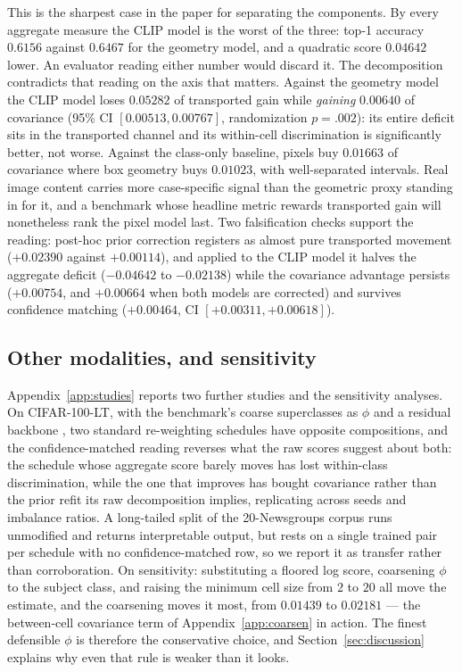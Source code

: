 This is the sharpest case in the paper for separating the components. By every aggregate
measure the CLIP model is the worst of the three: top-1 accuracy $0.6156$ against $0.6467$
for the geometry model, and a quadratic score $0.04642$ lower. An evaluator reading either
number would discard it. The decomposition contradicts that reading on the axis that
matters. Against the geometry model the CLIP model loses $0.05282$ of transported gain while
\emph{gaining} $0.00640$ of covariance (95\% CI $[0.00513,0.00767]$, randomization
$p=.002$): its entire deficit sits in the transported channel and its within-cell
discrimination is significantly better, not worse. Against the class-only baseline, pixels
buy $0.01663$ of covariance where box geometry buys $0.01023$, with well-separated intervals.
Real image content carries more case-specific signal than the geometric proxy standing in for
it, and a benchmark whose headline metric rewards transported gain will nonetheless rank the
pixel model last. Two falsification checks support the reading: post-hoc prior correction
registers as almost pure transported movement ($+0.02390$ against $+0.00114$), and applied to
the CLIP model it halves the aggregate deficit ($-0.04642$ to $-0.02138$) while the
covariance advantage persists ($+0.00754$, and $+0.00664$ when both models are corrected) and
survives confidence matching ($+0.00464$, CI $[+0.00311,+0.00618]$).

\subsection{Other modalities, and sensitivity}\label{sec:further}

Appendix~\ref{app:studies} reports two further studies and the sensitivity analyses. On
CIFAR-100-LT, with the benchmark's coarse superclasses as $\phi$ and a residual backbone
\citep{he2016deep}, two standard re-weighting schedules have opposite compositions, and the confidence-matched reading reverses what the raw
scores suggest about both: the schedule whose aggregate score barely moves has lost
within-class discrimination, while the one that improves has bought covariance rather than
the prior refit its raw decomposition implies, replicating across seeds and imbalance ratios.
A long-tailed split of the 20-Newsgroups corpus \citep{lang1995newsweeder} runs unmodified and returns interpretable output, but rests
on a single trained pair per schedule with no confidence-matched row, so we report it as
transfer rather than corroboration. On sensitivity: substituting a floored log score,
coarsening $\phi$ to the subject class, and raising the minimum cell size from $2$ to $20$ all
move the estimate, and the coarsening moves it most, from $0.01439$ to $0.02181$ --- the between-cell covariance term of
Appendix~\ref{app:coarsen} in action. The finest defensible
$\phi$ is therefore the conservative choice, and Section~\ref{sec:discussion} explains why
even that rule is weaker than it looks.

